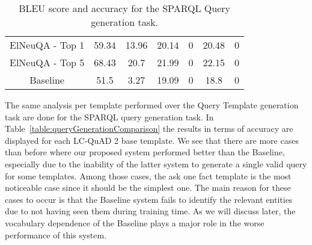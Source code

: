\begin{table}[h!]
\begin{tabular}{|c|cc|cc|cc|}
    ElNeuQA - Top 1                  & 59.34                                                                               & 13.96                                                             & 20.14                                                                               & 0                                                                 & 20.48                                                                               & 0                                                                 \\
    ElNeuQA - Top 5                  & 68.43                                                                               & 20.7                                                              & 21.99                                                                               & 0                                                                 & 22.15                                                                               & 0                                                                 \\ \hline
    Baseline                         & 51.5                                                                                & 3.27                                                              & 19.09                                                                               & 0                                                                 & 18.8                                                                                & 0                                                                 \\ \hline
    \end{tabular}%
    \caption{BLEU score and accuracy for the SPARQL Query generation task.}
    \label{table:queryGenerationTestResults}
\end{table}

The same analysis per template performed over the Query Template generation task are done for the 
SPARQL query generation task. In Table~\ref{table:queryGenerationComparison} the results in terms 
of accuracy are displayed for each LC-QuAD 2 base template. We see that there are more cases than 
before where our proposed system performed better than the Baseline, especially due to the 
inability of the latter system to generate a single valid query for some templates. Among those 
cases, the ask one fact template is the most noticeable case since it should be the simplest one. 
The main reason for these cases to occur is that the Baseline system fails to identify the 
relevant entities due to not having seen them during training time. As we will discuss later, the 
vocabulary dependence of the Baseline plays a major role in the worse performance of this system. 

